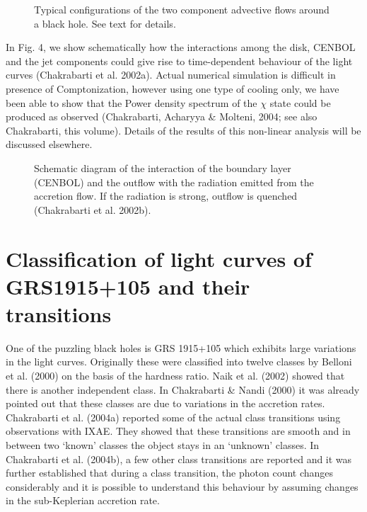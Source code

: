 \documentclass[referee]{cjaa}           %
\begin{document}
\begin{figure}
   \begin{center}
{\vskip 0.0cm
   \mbox{\textwidth{}\textwidth{}}}
\vskip 0.0cm
   \caption{Typical configurations of the two component advective flows around a black hole. See text for 
details. }
\end{center}
\end{figure}

In Fig. 4, we show schematically how the interactions among the disk, CENBOL and the jet components 
could give rise to time-dependent behaviour of the light curves (Chakrabarti et al. 2002a). Actual 
numerical simulation is difficult in presence of Comptonization, however using one type of cooling
only, we have been able to show that the Power density spectrum of the $\chi$ state could be produced as observed
(Chakrabarti, Acharyya \& Molteni, 2004; see also Chakrabarti, this volume). Details of the 
results of this non-linear analysis will be discussed elsewhere. 

\begin{figure}
   \begin{center}
{\vskip -0.5cm
   \mbox{\textwidth{}\textwidth{}}}
\vskip -3.0cm
   \caption{Schematic diagram of the interaction of the boundary layer (CENBOL)  and the outflow with
the radiation emitted from the accretion flow. If the radiation is strong, outflow is quenched (Chakrabarti
et al. 2002b).}
\end{center}
\end{figure}

\section{Classification of light curves of GRS1915+105 and their transitions}

One of the puzzling black holes is  GRS 1915+105 which exhibits large variations in
the light curves. Originally these were classified into twelve classes
by Belloni et al. (2000) on the basis of the hardness ratio. 
Naik et al. (2002) showed that there is another independent class. 
In Chakrabarti \& Nandi (2000) it was already pointed out that these classes
are due to variations in the accretion rates. Chakrabarti et al. (2004a)  
reported some of the actual class transitions using observations with IXAE. They showed that 
these transitions are smooth and in between two `known' classes the object stays in 
an `unknown' classes. In Chakrabarti et al. (2004b), a few other class transitions 
are reported and it was further established that during a class transition, the photon 
count changes considerably and it is possible to understand this behaviour 
by assuming changes in the sub-Keplerian accretion rate. 
\end{document}
